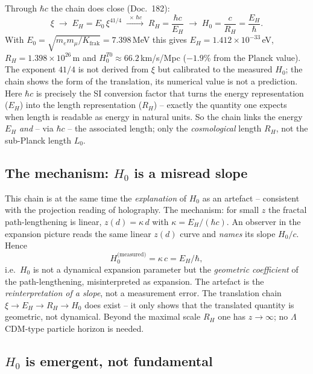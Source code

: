 Through $\hbar c$ the chain does close (Doc.~182):
\[
  \xi \;\longrightarrow\; E_H = E_0\,\xi^{41/4}
  \;\xrightarrow{\;\times\,\hbar c\;}\; R_H = \frac{\hbar c}{E_H}
  \;\longrightarrow\; H_0 = \frac{c}{R_H} = \frac{E_H}{\hbar}.
\]
With $E_0 = \sqrt{m_e m_\mu/K_{\text{frak}}} = 7.398$\,MeV this gives $E_H = 1.412\times
10^{-33}$\,eV, $R_H = 1.398\times10^{26}$\,m and $H_0^{T0} \approx
66.2$\,km/s/Mpc ($-1.9\%$ from the Planck value). The exponent $41/4$ is not
derived from $\xi$ but calibrated to the measured $H_0$; the chain shows the form
of the translation, its numerical value is not a prediction. Here $\hbar c$ is precisely
the SI conversion factor that turns the energy representation ($E_H$) into the
length representation ($R_H$) -- exactly the quantity one expects when length
is readable as energy in natural units. So the chain links the energy $E_H$ \emph{and} --
via $\hbar c$ -- the associated length; only the \emph{cosmological} length
$R_H$, not the sub-Planck length $L_0$.

\subsection*{The mechanism: $H_0$ is a misread slope}

This chain is at the same time the \emph{explanation} of $H_0$ as an artefact
-- consistent with the projection reading of holography. The mechanism: for
small $z$ the fractal path-lengthening is linear, $z(d) = \kappa\,d$ with
$\kappa = E_H/(\hbar c)$. An observer in the expansion picture reads the same
linear $z(d)$ curve and \emph{names} its slope $H_0/c$. Hence
\[
  H_0^{\text{(measured)}} = \kappa\,c = E_H/\hbar,
\]
i.e.\ $H_0$ is not a dynamical expansion parameter but the \emph{geometric
coefficient} of the path-lengthening, misinterpreted as expansion. The
artefact is the \emph{reinterpretation of a slope}, not a measurement error.
The translation chain $\xi \to E_H \to R_H \to H_0$ does exist -- it only
shows that the translated quantity is geometric, not dynamical. Beyond the
maximal scale $R_H$ one has $z\to\infty$; no $\Lambda$CDM-type particle
horizon is needed.

\subsection*{$H_0$ is emergent, not fundamental}

